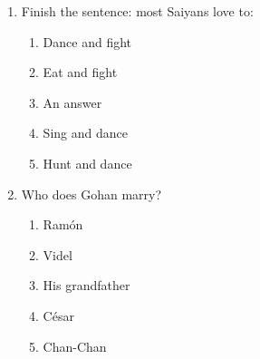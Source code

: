 \documentclass[letterpaper,addpoints,answers,twocolumn,10pt]{exam}
\begin{document}
\begin{enumerate}[leftmargin=.2in]
\begin{enumerate}[noitemsep,leftmargin=0in]
\end{enumerate}



\item  Finish the sentence: most Saiyans love to:


\begin{enumerate}[noitemsep,leftmargin=0in]


\item  Dance and fight
\item  Eat and fight
\item  An answer
\item  Sing and dance
\item  Hunt and dance


\end{enumerate}



\item  Who does Gohan marry?


\begin{enumerate}[noitemsep,leftmargin=0in]


\item  Ramón
\item  Videl
\item  His grandfather
\item  César
\item  Chan-Chan


\end{enumerate}



\end{enumerate}
\end{document}
